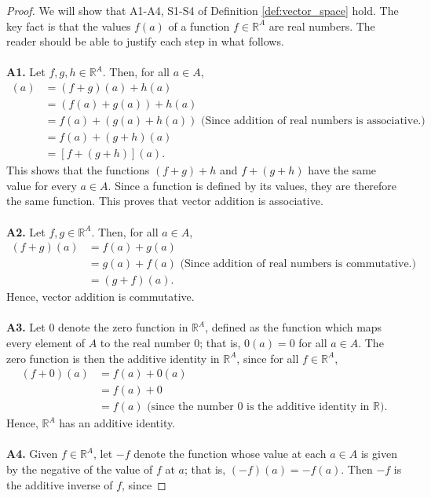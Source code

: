 \documentclass[12pt,letterpaper,reqno]{article}
\numberwithin{equation}{section}
\begin{document}
\begin{proof}
We will show that A1-A4, S1-S4 of Definition \ref{def:vector_space} hold. The key fact is that the values $f(a)$ of a function $f \in \mathbb{R}^A$ are real numbers. The reader should be able to justify each step in what follows.  \\
\\
{\bf A1.} Let $f,g,h \in \mathbb{R}^A$. Then, for all $a \in A$,
\begin{align*}
	[(f+g)+h](a)&=(f+g)(a)+h(a) \\
	&=(f(a)+g(a))+h(a) \\
	&=f(a)+(g(a)+h(a)) \text{ (Since addition of real numbers is associative.)}\\
	&=f(a)+(g+h)(a) \\
	&=[f+(g+h)](a).
\end{align*}
This shows that the functions $(f+g)+h$ and $f+(g+h)$ have the same value for every $a \in A$. Since a function is defined by its values, they are therefore the same function. This proves that vector addition is associative. \\
\\
{\bf A2.} Let $f,g \in \mathbb{R}^A$. Then, for all $a \in A$,
\begin{align*}
	(f+g)(a)&=f(a)+g(a) \\
	&=g(a)+f(a) \text{ (Since addition of real numbers is commutative.)} \\
	&=(g+f)(a).
\end{align*}
Hence, vector addition is commutative. \\
\\
{\bf A3.} Let $0$ denote the zero function in $\mathbb{R}^A$, defined as the function which maps every element of $A$ to the real number $0$; that is, $0(a)=0$ for all $a \in A$. The zero function is then the additive identity in $\mathbb{R}^A$, since for all $f \in \mathbb{R}^A$,
\begin{align*}
	(f+0)(a)&=f(a)+0(a) \\
	&=f(a)+0 \\
	&=f(a) \text{ (since the number 0 is the additive identity in $\mathbb{R}$).}
\end{align*} 
Hence, $\mathbb{R}^A$ has an additive identity. \\
\\
{\bf A4.} Given $f \in \mathbb{R}^A$, let $-f$ denote the function whose value at each $a \in A$ is given by the negative of the value of $f$ at $a$; that is, $(-f)(a)=-f(a)$. Then $-f$ is the additive inverse of $f$, since

\end{proof}
\end{document}
